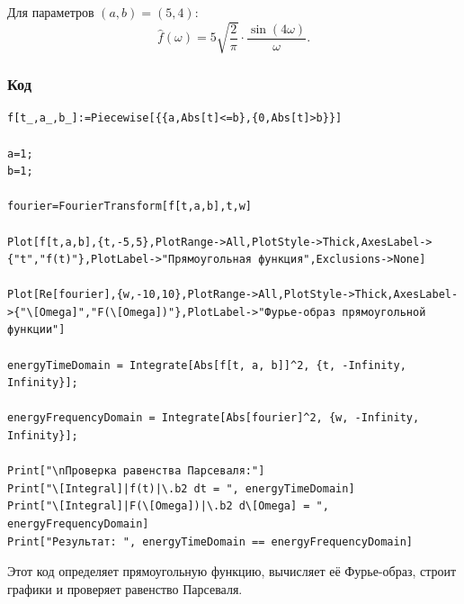 \documentclass[a4paper,12pt]{article}
\begin{document}
Для параметров \( (a, b) = (5, 4) \):
\[
\hat{f}(\omega) = 5 \sqrt{\frac{2}{\pi}} \cdot \frac{\sin(4\omega)}{\omega}.
\]

\subsubsection{Код}
\begin{lstlisting}[caption=Фурье-образ прямоугольной функции и проверка равенства Парсеваля]
f[t_,a_,b_]:=Piecewise[{{a,Abs[t]<=b},{0,Abs[t]>b}}]

a=1;
b=1;

fourier=FourierTransform[f[t,a,b],t,w]

Plot[f[t,a,b],{t,-5,5},PlotRange->All,PlotStyle->Thick,AxesLabel->{"t","f(t)"},PlotLabel->"Прямоугольная функция",Exclusions->None]

Plot[Re[fourier],{w,-10,10},PlotRange->All,PlotStyle->Thick,AxesLabel->{"\[Omega]","F(\[Omega])"},PlotLabel->"Фурье-образ прямоугольной функции"]

energyTimeDomain = Integrate[Abs[f[t, a, b]]^2, {t, -Infinity, Infinity}];

energyFrequencyDomain = Integrate[Abs[fourier]^2, {w, -Infinity, Infinity}];

Print["\nПроверка равенства Парсеваля:"]
Print["\[Integral]|f(t)|\.b2 dt = ", energyTimeDomain]
Print["\[Integral]|F(\[Omega])|\.b2 d\[Omega] = ", energyFrequencyDomain]
Print["Результат: ", energyTimeDomain == energyFrequencyDomain]
\end{lstlisting}
Этот код определяет прямоугольную функцию, вычисляет её Фурье-образ, строит графики и проверяет равенство Парсеваля.
\end{document}
